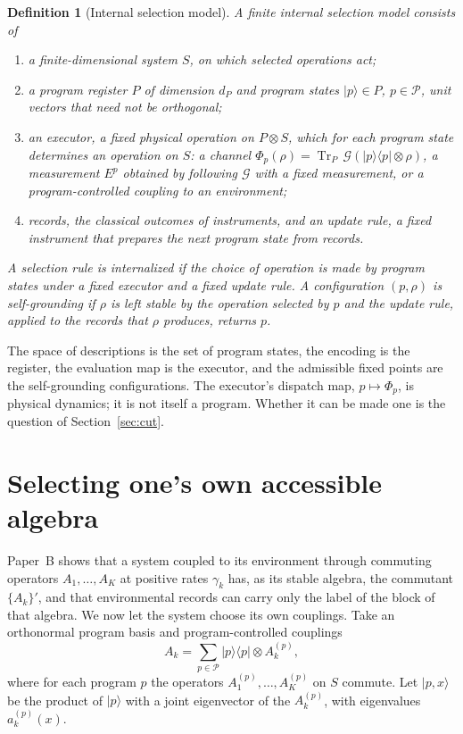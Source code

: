 \documentclass[12pt,a4paper]{article}
\newtheorem{definition}[theorem]{Definition}
\newcommand{\ket}[1]{|#1\rangle}
\newcommand{\proj}[1]{|#1\rangle\!\langle #1|}
\newcommand{\Tr}{\operatorname{Tr}}
\begin{document}
\begin{definition}[Internal selection model]
\label{def:model}
A finite internal selection model consists of
\begin{enumerate}
\item a finite-dimensional system $S$, on which selected operations act;
\item a program register $P$ of dimension $d_P$ and program states $\ket p\in P$, $p\in\mathcal P$, unit vectors that need not be orthogonal;
\item an executor, a fixed physical operation on $P\otimes S$, which for each program state determines an operation on $S$: a channel $\Phi_p(\rho)=\Tr_P\,\mathcal G(\proj p\otimes\rho)$, a measurement $E^p$ obtained by following $\mathcal G$ with a fixed measurement, or a program-controlled coupling to an environment;
\item records, the classical outcomes of instruments, and an update rule, a fixed instrument that prepares the next program state from records.
\end{enumerate}
A selection rule is internalized if the choice of operation is made by program states under a fixed executor and a fixed update rule. A configuration $(p,\rho)$ is self-grounding if $\rho$ is left stable by the operation selected by $p$ and the update rule, applied to the records that $\rho$ produces, returns $p$.
\end{definition}

The space of descriptions is the set of program states, the encoding is the register, the evaluation map is the executor, and the admissible fixed points are the self-grounding configurations. The executor's dispatch map, $p\mapsto\Phi_p$, is physical dynamics; it is not itself a program. Whether it can be made one is the question of Section~\ref{sec:cut}.

\section{Selecting one's own accessible algebra}
\label{sec:own}

Paper~B shows that a system coupled to its environment through commuting operators $A_1,\dots,A_K$ at positive rates $\gamma_k$ has, as its stable algebra, the commutant $\{A_k\}'$, and that environmental records can carry only the label of the block of that algebra. We now let the system choose its own couplings. Take an orthonormal program basis and program-controlled couplings
\begin{equation}
A_k=\sum_{p\in\mathcal P}\proj p\otimes A_k^{(p)},
\label{eq:controlled}
\end{equation}
where for each program $p$ the operators $A_1^{(p)},\dots,A_K^{(p)}$ on $S$ commute. Let $\ket{p,x}$ be the product of $\ket p$ with a joint eigenvector of the $A_k^{(p)}$, with eigenvalues $a_k^{(p)}(x)$.
\end{document}
